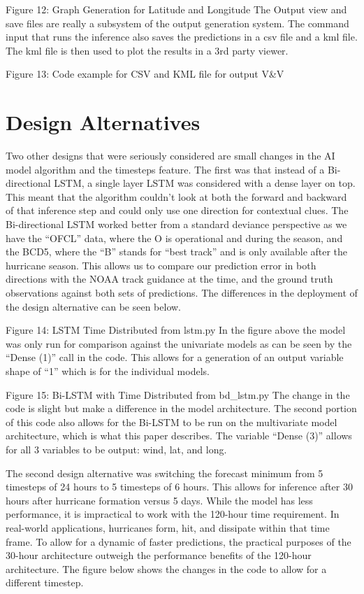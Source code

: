 \documentclass{article}
\begin{document}
Figure 12: Graph Generation for Latitude and Longitude
The Output view and save files are really a subsystem of the output generation system. The command input that runs the inference also saves the predictions in a csv file and a kml file. The kml file is then used to plot the results in a 3rd party viewer. 


Figure 13: Code example for CSV and KML file for output V&V

\section{Design Alternatives}
Two other designs that were seriously considered are small changes in the AI model algorithm and the timesteps feature. The first was that instead of a Bi-directional LSTM, a single layer LSTM was considered with a dense layer on top. This meant that the algorithm couldn’t look at both the forward and backward of that inference step and could only use one direction for contextual clues. The Bi-directional LSTM worked better from a standard deviance perspective as we have the “OFCL” data, where the O is operational and during the season, and the BCD5, where the “B” stands for “best track” and is only available after the hurricane season. This allows us to compare our prediction error in both directions with the NOAA track guidance at the time, and the ground truth observations against both sets of predictions. The differences in the deployment of the design alternative can be seen below.

Figure 14: LSTM Time Distributed from lstm.py
In the figure above the model was only run for comparison against the univariate models as can be seen by the “Dense (1)” call in the code. This allows for a generation of an output variable shape of “1” which is for the individual models.


Figure 15: Bi-LSTM with Time Distributed from bd_lstm.py
The change in the code is slight but make a difference in the model architecture. The second portion of this code also allows for the Bi-LSTM to be run on the multivariate model architecture, which is what this paper describes. The variable “Dense (3)” allows for all 3 variables to be output: wind, lat, and long.

The second design alternative was switching the forecast minimum from 5 timesteps of 24 hours to 5 timesteps of 6 hours. This allows for inference after 30 hours after hurricane formation versus 5 days. While the model has less performance, it is impractical to work with the 120-hour time requirement. In real-world applications, hurricanes form, hit, and dissipate within that time frame. To allow for a dynamic of faster predictions, the practical purposes of the 30-hour architecture outweigh the performance benefits of the 120-hour architecture. The figure below shows the changes in the code to allow for a different timestep. 
\end{document}
